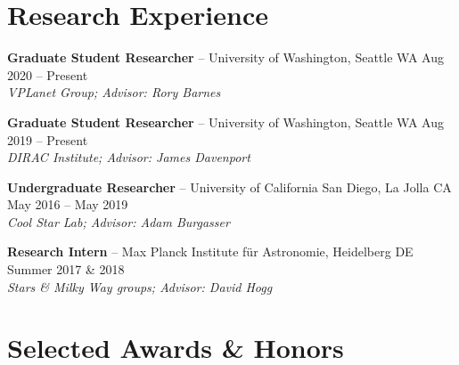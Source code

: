 \documentclass[a4,10.5pt]{article}
\begin{document}
\section{Research Experience} 

\textbf{Graduate Student Researcher} -- University of Washington, Seattle WA \hfill Aug 2020 -- Present \\
\textsl{VPLanet Group; Advisor: Rory Barnes} \\
\vspace{.2cm} 

\textbf{Graduate Student Researcher} -- University of Washington, Seattle WA \hfill Aug 2019 -- Present \\
\textsl{DIRAC Institute; Advisor: James Davenport} \\
\vspace{.2cm} 

\textbf{Undergraduate Researcher} -- University of California San Diego, La Jolla CA \hfill May 2016 -- May 2019  \\
\textsl{Cool Star Lab; Advisor: Adam Burgasser} \\
\vspace{.2cm} 

\textbf{Research Intern} -- Max Planck Institute f{\"u}r Astronomie, Heidelberg DE \hfill Summer 2017 \& 2018 \\
\textsl{Stars \& Milky Way groups; Advisor: David Hogg} \\


\section{Selected Awards \& Honors}
\end{document}
